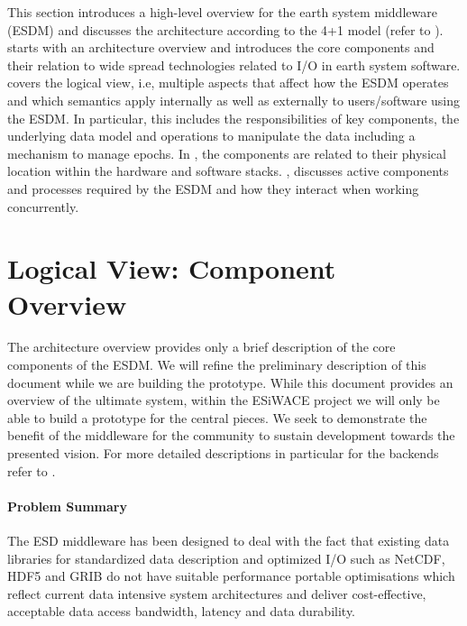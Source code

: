 \begin{chapterIntro}
This section introduces a high-level overview for the earth system middleware (ESDM) and discusses the architecture according to the 4+1 model (refer to ).
 starts with an architecture overview and introduces the core components and their relation to wide spread technologies related to I/O in earth system software.
 covers the logical view, i.e, multiple aspects that affect how the ESDM operates and which semantics apply internally as well as externally to users/software using the ESDM.
In particular, this includes the responsibilities of key components, the underlying data model and operations to manipulate the data including a mechanism to manage epochs.
In , the components are related to their physical location within the hardware and software stacks.
, discusses active components and processes required by the ESDM and how they interact when working concurrently.
\end{chapterIntro}


\section{Logical View: Component Overview}
\label{sec: viewpoints/logical}


The architecture overview provides only a brief description of the core components of the ESDM.
We will refine the preliminary description of this document while we are building the prototype.
While this document provides an overview of the ultimate system, within the ESiWACE project we will only be able to build a prototype for the central pieces.
We seek to demonstrate the benefit of the middleware for the community to sustain development towards the presented vision.
For more detailed descriptions in particular for the backends refer to .


\paragraph {Problem Summary}
The ESD middleware has been designed to deal with the fact that existing  data
libraries for standardized data description and optimized I/O such as NetCDF,
HDF5 and GRIB do not have suitable performance portable optimisations which
reflect current data intensive system architectures and deliver cost-effective,
acceptable data access bandwidth, latency and data durability.

